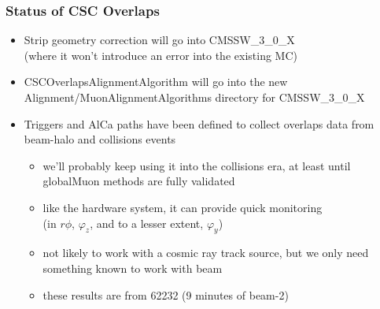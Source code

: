 \documentclass[compress]{beamer}
\begin{document}
\begin{frame}
\frametitle{Status of CSC Overlaps}
\begin{itemize}\setlength{\itemsep}{0.35 cm}
\item Strip geometry correction will go into CMSSW\_3\_0\_X \\ (where it
  won't introduce an error into the existing MC)
\item CSCOverlapsAlignmentAlgorithm will go into the new
  Alignment/MuonAlignmentAlgorithms directory for CMSSW\_3\_0\_X
\item Triggers and AlCa paths have been defined to collect overlaps
  data from beam-halo and collisions events
\begin{itemize}\setlength{\itemsep}{0.1 cm}
\item we'll probably keep using it into the collisions era, at least
  until globalMuon methods are fully validated
\item like the hardware system, it can provide quick monitoring \\ (in
  $r\phi$, $\varphi_z$, and to a lesser extent, $\varphi_y$)
\item not likely to work with a cosmic ray track source, but we only
  need something known to work with beam
\item these results are from 62232 (9 minutes of beam-2)
\end{itemize}
\end{itemize}
\end{frame}

\end{document}
